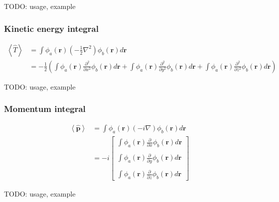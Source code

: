 \documentclass[letterpaper]{article}
\begin{document}
TODO: usage, example
\subsubsection{Kinetic energy integral}
\begin{equation}
  \label{eq:kinetic_energy}
  \begin{split}
    \left< \hat{T} \right>
    &= \int \phi_a(\mathbf{r}) \left( -\frac{1}{2} \nabla^2 \right) \phi_b(\mathbf{r}) d\mathbf{r}\\
    &= -\frac{1}{2}
    \left(
      \int \phi_a(\mathbf{r}) \frac{\partial^2}{\partial x^2} \phi_b(\mathbf{r}) d\mathbf{r}
      + \int \phi_a(\mathbf{r}) \frac{\partial^2}{\partial y^2} \phi_b(\mathbf{r}) d\mathbf{r}
      + \int \phi_a(\mathbf{r}) \frac{\partial^2}{\partial z^2} \phi_b(\mathbf{r}) d\mathbf{r}
    \right)
  \end{split}
\end{equation}

TODO: usage, example
\subsubsection{Momentum integral}
\begin{equation}
  \label{eq:momentum}
  \begin{split}
    \left< \hat{\mathbf{p}} \right>
    &= \int \phi_a(\mathbf{r}) \left( -i \nabla \right) \phi_b(\mathbf{r}) d\mathbf{r}\\
    &= -i
    \begin{bmatrix}
      \int \phi_a(\mathbf{r}) \frac{\partial}{\partial x} \phi_b(\mathbf{r}) d\mathbf{r}\\\\
      \int \phi_a(\mathbf{r}) \frac{\partial}{\partial y} \phi_b(\mathbf{r}) d\mathbf{r}\\\\
      \int \phi_a(\mathbf{r}) \frac{\partial}{\partial z} \phi_b(\mathbf{r}) d\mathbf{r}
    \end{bmatrix}
  \end{split}
\end{equation}

TODO: usage, example
\end{document}
